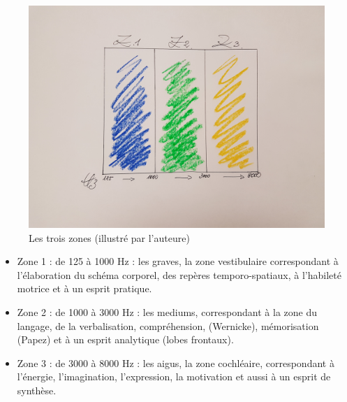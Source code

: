 \begin{figure}
	\centering
	\includegraphics[width=0.5\linewidth]{images/les3zones.jpg}
	\caption[Les 3 zones]{Les trois zones (illustré par l'auteure)}
	\label{Les trois zones du test d'écoute}
\end{figure}


\begin{itemize}
	\item Zone 1 : de 125 à 1000 Hz : les graves, la zone vestibulaire correspondant à l'élaboration
	du schéma corporel, des repères temporo-spatiaux, à l'habileté motrice et à un 
	esprit pratique.
	\item Zone 2 : de 1000 à 3000 Hz : les mediums, correspondant à  la zone du langage, de la
	verbalisation, compréhension, (Wernicke),
	mémorisation (Papez) et à un esprit analytique (lobes frontaux).
	\item Zone 3 : de 3000 à 8000 Hz : les aigus, la zone cochléaire, correspondant à l'énergie,
	 l'imagination, l'expression, la motivation et aussi à un esprit de synthèse.
	
\end{itemize}
 

